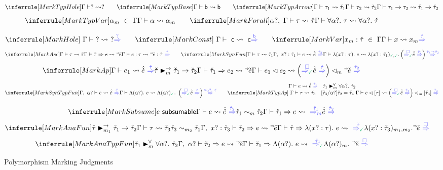 \begin{figure}
    \centering

    \judgbox{\MarkTyp{\BTV}{\MTV}}
    \[
    \MarkTHole \hspace{20pt} \MarkTBase \hspace{20pt} \MarkTArrow
    \]
    \[
    \MarkTVar \hspace{20pt} \MarkForall
    \]

    \judgbox{\MarkSyn{\BEV}{\MEUV}}
    \[
    \MarkHole\hspace{20pt}\MarkConst\hspace{20pt}\PolyMarkVar
    \]
    \[
    \PolyMarkAsc\hspace{20pt}\PolyMarkSynFun
    \]
    \[
    \PolyMarkAp
    \]
    \[
    \MarkSynTFun \hspace{20pt} \MarkTAp
    \]

    \vspace{5pt}
    \judgbox{\MarkAna{\MTV}{\BEV}{\MEUV}}
    \[
    \PolyMarkSubsume
    \]
    \[
    \PolyMarkAnaFun
    \]
    \[
    \MarkAnaTFun
    \]

    
    \vspace{-10pt}
    \caption{Polymorphism Marking Judgments}
    \label{fig:appendix-polymorphism-marking}
\end{figure}



